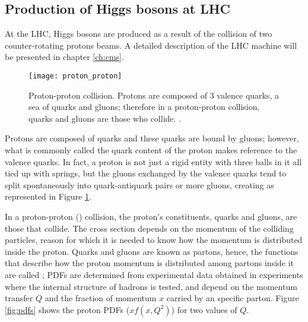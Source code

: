 \subsection{Production of Higgs bosons at LHC}

At the LHC, Higgs bosons are produced as a result of the collision of two counter-rotating protons beams. A detailed description of the LHC machine will be presented in chapter \ref{ch:cms}.%
\begin{figure}[!h]
\centering
\texttt{[image: proton\_proton]}
\caption[Proton-Proton collision]{Proton-proton collision. Protons are composed of 3 valence quarks, a sea of quarks and gluons; therefore in a proton-proton collision, quarks and gluons are those who collide. \cite{pp_coll}.}
\label{pp_collision}
\end{figure}

Protons are composed of quarks and these quarks are bound by gluons; however, what is commonly called the quark content of the proton makes reference to the valence quarks. In fact, a proton is not just a rigid entity with three balls in it all tied up with springs, but the gluons exchanged by the valence quarks tend to split spontaneously into quark-antiquark pairs or more gluons, creating  as represented in Figure \ref{pp_collision}.

In a proton-proton (\pp) collision, the proton's constituents, quarks and gluons, are those that collide. The \pp cross section depends on the momentum of the colliding particles, reason for which it is needed to know how the momentum is distributed inside the proton. Quarks and gluons are known as partons, hence, the functions that describe how the proton momentum is distributed among partons inside it are called ; PDFs are determined from experimental data obtained in experiments where the internal structure of hadrons is tested, and depend on the momentum transfer $Q$ and the fraction of momentum $x$ carried by an specific parton. Figure \ref{fig:pdfs} shows the proton PDFs ($xf(x,Q^2)$) for two values of $Q$.     

